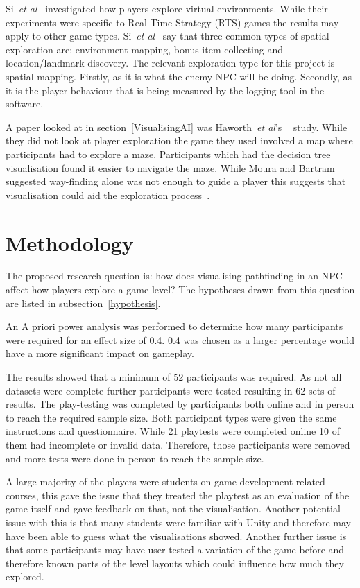 \documentclass[journal]{IEEEtran}
\begin{document}
	Si~\textit{et al}~\cite{si2017} investigated how players explore virtual environments. While their experiments were specific to Real Time Strategy (RTS) games the results may apply to other game types. Si~\textit{et al}~\cite{si2017} say that three common types of spatial exploration are; environment mapping, bonus item collecting and location/landmark discovery. The relevant exploration type for this project is spatial mapping. Firstly, as it is what the enemy NPC will be doing.  Secondly, as it is the player behaviour that is being measured by the logging tool in the software.
	
	A paper looked at in section~\ref{VisualisingAI} was Haworth~\textit{et al}'s ~\cite{Haworth2010} study. While they did not look at player exploration the game they used involved a map where participants had to explore a maze. Participants which had the decision tree visualisation found it easier to navigate the maze. While Moura and Bartram~\cite{moura2014} suggested way-finding alone was not enough to guide a player this suggests that visualisation could aid the exploration process~\cite{Haworth2010}.
	
	\section{Methodology} \label{methodology}
	The proposed research question is: how does visualising pathfinding in an NPC affect how players explore a game level? The hypotheses drawn from this question are listed in subsection~\ref{hypothesis}.  
	
	An A priori power analysis was performed to determine how many participants were required for an effect size of 0.4. 0.4 was chosen as a larger percentage would have a more significant impact on gameplay.
	
	The results showed that a minimum of 52 participants was required. As not all datasets were complete further participants were tested resulting in 62 sets of results.     
	The play-testing was completed by participants both online and in person to reach the required sample size. Both participant types were given the same instructions and questionnaire. While 21 playtests were completed online 10 of them had incomplete or invalid data. Therefore, those participants were removed and more tests were done in person to reach the sample size.
	
	A large majority of the players were students on game development-related courses, this gave the issue that they treated the playtest as an evaluation of the game itself and gave feedback on that, not the visualisation.  Another potential issue with this is that many students were familiar with Unity and therefore may have been able to guess what the visualisations showed. 
	Another further issue is that some participants may have user tested a variation of the game before and therefore known parts of the level layouts which could influence how much they explored. 
	
\end{document}
